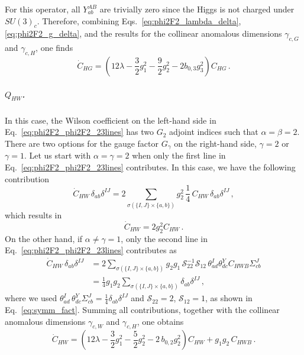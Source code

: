 For this operator, all $Y^{AB}_{ab}$ are trivially zero since the Higgs is not charged under $SU(3)_c$. Therefore, combining Eqs.~\eqref{eq:phi2F2_lambda_delta}, \eqref{eq:phi2F2_g_delta}, and the results for the collinear anomalous dimensions $\gamma_{c,G}$ and $\gamma_{c,H}$, one finds
\begin{equation}
    \dot{C}_{HG} = \left(12\lambda -\frac{3}{2} g_1^2 -\frac{9}{2} g_2^2  - 2 b_{0,3} g_3^2\right) C_{HG}\,.
\end{equation}

\subparagraph{\texorpdfstring{$Q_{HW}$}{Q_HW}.} In this case, the Wilson coefficient on the left-hand side in Eq.~\eqref{eq:phi2F2_phi2F2_23lines} has two $G_2$ adjoint indices such that $\alpha=\beta=2$. There are two options for the gauge factor $G_\gamma$ on the right-hand side, $\gamma=2$ or $\gamma=1$. Let us start with $\alpha=\gamma=2$ when only the first line in Eq.~\eqref{eq:phi2F2_phi2F2_23lines} contributes. In this case, we have the following contribution 
\begin{equation}
    \dot{C}_{HW}\, \delta_{ab} \delta^{IJ} = 2\sum_{\sigma(\{I,J\}\times \{a , b\})} g_2^2\, \frac{1}{4}\, C_{HW}\, \delta_{ab} \delta^{IJ}\,,
\end{equation}
which results in 
\begin{equation}
    \dot{C}_{HW} = 2 g_2^2 C_{HW}\,.
\end{equation}
On the other hand, if $\alpha\ne\gamma=1$, only the second line in Eq.~\eqref{eq:phi2F2_phi2F2_23lines} contributes as
\begin{align}
     \dot{C}_{HW}\, \delta_{ab} \delta^{IJ} &= 2\sum_{\sigma(\{I,J\}\times \{a , b\})} g_2 g_1\, \mathcal{S}_{22}^{-1} \mathcal{S}_{12}\,\theta_{ad}^{I}\theta^Y_{dc} C_{HWB} \Sigma_{cb}^J\nonumber\\
     &= \frac{1}{4} g_1 g_2 \sum_{\sigma(\{I,J\}\times \{a , b\})} \delta_{ab} \delta^{IJ}\,,
\end{align}
where we used $\theta_{ad}^I\,\theta^Y_{dc} \Sigma_{cb}^J = \frac{1}{4} \delta_{ab} \delta^{IJ}$ and $\mathcal{S}_{22} =2$, $\mathcal{S}_{12} =1$, as shown in Eq.~\eqref{eq:symm_fact}.
Summing all contributions, together with the collinear anomalous dimensions $\gamma_{c,W}$ and $\gamma_{c,H}$, one obtains
\begin{equation}
     \dot{C}_{HW} = \left(12\lambda-\frac{3}{2} g_1^2 - \frac{5}{2}g_2^2 -2\,b_{0,2}g_2^2\right) C_{HW} + g_1 g_2 \,C_{HWB}\,.
\end{equation}


